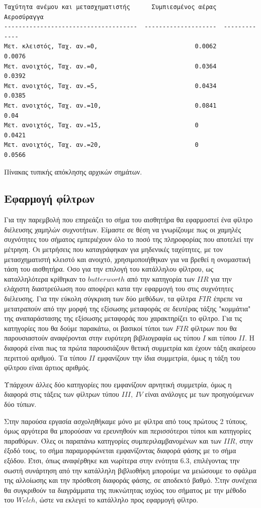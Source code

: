 \documentclass[breaklines=true, 12pt]{article}
\begin{document}
\begin{verbatim}
Ταχύτητα ανέμου και μετασχηματιστής      Συμπιεσμένος αέρας    Αεροσύραγγα
-------------------------------------  --------------------  -------------
Μετ. κλειστός, Ταχ. αν.=0,                           0.0062         0.0076
Μετ. ανοιχτός, Ταχ. αν.=0,                           0.0364         0.0392
Μετ. ανοιχτός, Ταχ. αν.=5,                           0.0434         0.0385
Μετ. ανοιχτός, Ταχ. αν.=10,                          0.0841         0.04
Μετ. ανοιχτός, Ταχ. αν.=15,                          0              0.0421
Μετ. ανοιχτός, Ταχ. αν.=20,                          0              0.0566
\end{verbatim}
Πίνακας τυπικής απόκλησης αρχικών σημάτων.

\subsection{Εφαρμογή φίλτρων}
\label{sec:org48714cb}
Για την παρεμβολή που επηρεάζει το σήμα του αισθητήρα θα εφαρμοστεί ένα φίλτρο
διέλευσης χαμηλών συχνοτήτων. Είμαστε σε θέση να γνωρίζουμε πως οι χαμηλές
συχνότητες του σήματος εμπεριέχουν όλο το ποσό της πληροφορίας που αποτελεί
την μέτρηση. Οι μετρήσεις που καταγράφηκαν για μηδενικές ταχύτητες, με τον
μετασχηματιστή κλειστό και ανοιχτό, χρησιμοποιήθηκαν για να βρεθεί η
ονομαστική τάση του αισθητήρα. Οσο για την επιλογή του κατάλληλου φίλτρου,
ως καταλληλότερα κρίθηκαν το \(butterworth\) από την κατηγορία των \(IIR\) για την
ελάχιστη διαστρεύλωση που αποφέρει κατα την εφαρμογή του στις συχνότητες
διέλευσης. Για την εύκολη σύγκριση των δύο μεθόδων, τα φίλτρα \(FIR\) έπρεπε να
μετατραπούν από την μορφή της εξίσωσης μεταφοράς σε δευτέρας τάξης "κομμάτια"
της αναπαράστασης της εξίσωσης μεταφοράς που χαρακτηρίζει το φίλτρο. Για τις
κατηγορίες που θα δούμε παρακάτω, οι βασικοί τύποι των \(FIR\) φίλτρων που θα
παρουσιαστούν αναφέρονται στην ευρύτερη βιβλιογραφία ως τύπου \(I\) και τύπου \(II\).
Η διαφορά είναι πως τα πρώτα παρουσιάζουν θετική συμμετρία και έχουν τάξη
ακαίρεου περιττού αριθμού. Τα τύπου \(II\) εμφανίζουν την ίδια συμμετρία, όμως
η τάξη του φίλτρου είναι άρτιος αριθμός.

Υπάρχουν άλλες δύο κατηγορίες που εμφανίζουν αρνητική συμμετρία, όμως η
διαφορά στις τάξεις των φίλτρων τύπου \(III,\ IV\) είναι ανάλογες με των προηγούμενων
δύο τύπων.

Στην παρούσα εργασία ασχοληθήκαμε μόνο με φίλτρα από τους πρώτους 2 τύπους,
όμως αργότερα θα μπορούσαν να ερευνηθούν και περισσότεροι τύποι και
κατηγορίες παραθύρων. Όλες οι παραπάνω κατηγορίες συμπεριλαμβανομένων και
των \(IIR\), στην έξοδό τους, το σήμα παραμορφώνεται εμφανίζοντας διαφορά φάσης
με το σήμα εξόδου. Έτσι, όπως αναφέρθηκε και νωρίτερα στην ενότητα 6.3,
επιλέγοντας την σωστή συνάρτηση από την κατάλληλη βιβλιοθήκη μπορούμε να
μειώσουμε το σφάλμα της αλλοίωσης και την πρόσθεση διαφοράς φάσης, σε
αποδεκτό βαθμό. Στην συνέχεια θα συγκριθούν τα διαγράμματα της πυκνώτητας
ισχύος του σήματος με την μέθοδο του \(Welch\), ώστε να εκλεγεί το κατάλληλο
προς εφαρμογή φίλτρο.
\end{document}
